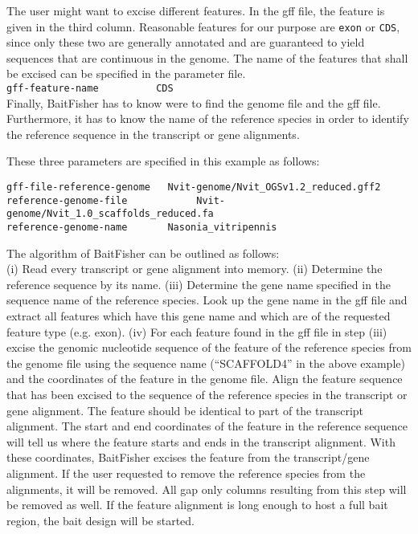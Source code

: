 \documentclass[a4paper,pdflatex,11pt]{article}
\begin{document}
The user might want to excise different features. In the gff file, the feature is given in the third column.
Reasonable features for our purpose are \verb+exon+ or \verb+CDS+, since only these two are
generally annotated and are guaranteed to yield sequences that are continuous in the genome.
The name of the features that shall be excised can be specified in the parameter file.\\
\verb+gff-feature-name			CDS+\\

Finally, BaitFisher has to know were to find the genome file and the gff file.
Furthermore, it has to know the name of the reference species in order to identify the
reference sequence in the transcript or gene alignments.

These three parameters are specified in this example as follows:
\begin{verbatim}
gff-file-reference-genome	Nvit-genome/Nvit_OGSv1.2_reduced.gff2
reference-genome-file            Nvit-genome/Nvit_1.0_scaffolds_reduced.fa
reference-genome-name		Nasonia_vitripennis
\end{verbatim}

The algorithm of BaitFisher can be outlined as follows:\\
(i) Read every transcript or gene alignment into memory.
(ii) Determine the reference sequence by its name.
(iii) Determine the gene name specified in the sequence name of the reference species.
Look up the gene name in the gff file and extract all features which have this gene name
and which are of the requested feature type (e.g. exon).
(iv) For each feature found in the gff file in step (iii) excise the genomic nucleotide sequence of 
the feature of the reference species from the genome file using the sequence name
(``SCAFFOLD4'' in the above example) and the
coordinates of the feature in the  genome file. Align the feature sequence that has been excised
to the sequence of the reference species in the transcript or gene alignment. The feature should be identical to part of the transcript alignment.
The start and end coordinates of the feature in the reference sequence
will tell us where the feature starts and ends in the transcript alignment.
With these coordinates, BaitFisher excises the feature from the transcript/gene alignment.
If the user requested to remove the reference species from the alignments,
it will be removed. All gap only columns resulting from this step will be removed as well.
If the feature alignment is long enough to host a full bait region, the bait design will be started.\\
\end{document}
